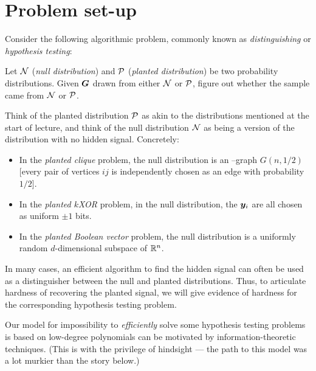 \documentclass[11pt, letterpaper]{article}
\newcommand{\Null}{\calN}
\newcommand{\Planted}{\calP}
\begin{document}

\section{Problem set-up}
Consider the following algorithmic problem, commonly known as \emph{distinguishing} or \emph{hypothesis testing}:
\begin{tcolorbox}[arc=3mm,colback=White,coltext=Black,boxrule=1pt]
    Let $\Null$ (\emph{null distribution}) and $\Planted$ (\emph{planted distribution}) be two probability distributions.
    Given $\boldsymbol{G}$ drawn from either $\Null$ or $\Planted$, figure out whether the sample came from $\Null$ or $\Planted$.
\end{tcolorbox}
Think of the planted distribution $\Planted$ as akin to the distributions mentioned at the start of lecture, and think of the null distribution $\Null$ as being a version of the distribution with no hidden signal.
Concretely:
\begin{itemize}
    \item In the \emph{planted clique} problem, the null distribution is an \erdos--\renyi graph $G(n,1/2)$ [every pair of vertices $ij$ is independently chosen as an edge with probability $1/2$].
    \item In the \emph{planted $k$XOR} problem, in the null distribution, the $\boldsymbol{y}_i$ are all chosen as uniform $\pm1$ bits.
    \item In the \emph{planted Boolean vector} problem, the null distribution is a uniformly random $d$-dimensional subspace of $\mathbb R^n$.
\end{itemize}
In many cases, an efficient algorithm to find the hidden signal can often be used as a distinguisher between the null and planted distributions.
Thus, to articulate hardness of recovering the planted signal, we will give evidence of hardness for the corresponding hypothesis testing problem.

Our model for impossibility to \emph{efficiently} solve some hypothesis testing problems is based on low-degree polynomials can be motivated by information-theoretic techniques.
(This is with the privilege of hindsight --- the path to this model was a lot murkier than the story below.) 
\end{document}
